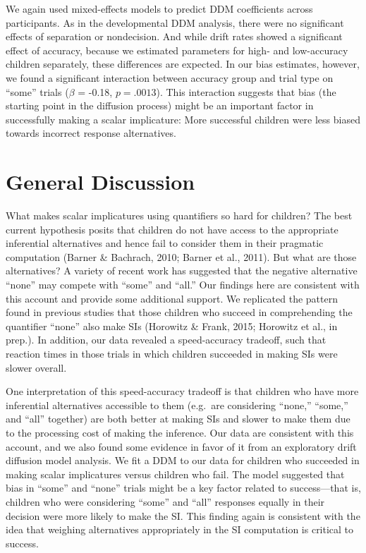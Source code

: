 \documentclass[10pt, letterpaper]{article}
\begin{document}
We again used mixed-effects models to predict DDM coefficients across
participants. As in the developmental DDM analysis, there were no
significant effects of separation or nondecision. And while drift rates
showed a significant effect of accuracy, because we estimated parameters
for high- and low-accuracy children separately, these differences are
expected. In our bias estimates, however, we found a significant
interaction between accuracy group and trial type on ``some'' trials
(\(\beta\) = -0.18, \(p = .0013\)). This interaction suggests that bias
(the starting point in the diffusion process) might be an important
factor in successfully making a scalar implicature: More successful
children were less biased towards incorrect response alternatives.

\section{General Discussion}\label{general-discussion}

What makes scalar implicatures using quantifiers so hard for children?
The best current hypothesis posits that children do not have access to
the appropriate inferential alternatives and hence fail to consider them
in their pragmatic computation (Barner \& Bachrach, 2010; Barner et al.,
2011). But what are those alternatives? A variety of recent work has
suggested that the negative alternative ``none'' may compete with
``some'' and ``all.'' Our findings here are consistent with this account
and provide some additional support. We replicated the pattern found in
previous studies that those children who succeed in comprehending the
quantifier ``none'' also make SIs (Horowitz \& Frank, 2015; Horowitz et
al., in prep.). In addition, our data revealed a speed-accuracy
tradeoff, such that reaction times in those trials in which children
succeeded in making SIs were slower overall.

One interpretation of this speed-accuracy tradeoff is that children who
have more inferential alternatives accessible to them (e.g.~are
considering ``none,'' ``some,'' and ``all'' together) are both better at
making SIs and slower to make them due to the processing cost of making
the inference. Our data are consistent with this account, and we also
found some evidence in favor of it from an exploratory drift diffusion
model analysis. We fit a DDM to our data for children who succeeded in
making scalar implicatures versus children who fail. The model suggested
that bias in ``some'' and ``none'' trials might be a key factor related
to success---that is, children who were considering ``some'' and ``all''
responses equally in their decision were more likely to make the SI.
This finding again is consistent with the idea that weighing
alternatives appropriately in the SI computation is critical to success.
\end{document}

